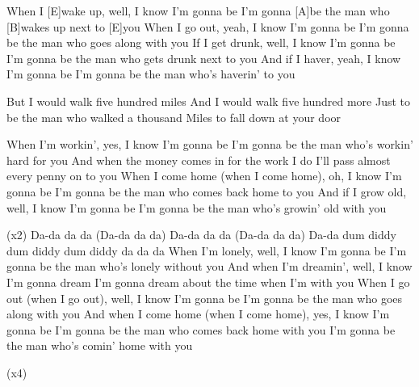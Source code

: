 

\begin{guitar}
	When I [E]wake up, well, I know I'm gonna be
	I'm gonna [A]be the man who [B]wakes up next to [E]you
	When I go out, yeah, I know I'm gonna be
	I'm gonna be the man who goes along with you
	If I get drunk, well, I know I'm gonna be
	I'm gonna be the man who gets drunk next to you
	And if I haver, yeah, I know I'm gonna be
	I'm gonna be the man who's haverin' to you
	
	But I would walk five hundred miles
	And I would walk five hundred more
	Just to be the man who walked a thousand
	Miles to fall down at your door
	
	When I'm workin', yes, I know I'm gonna be
	I'm gonna be the man who's workin' hard for you
	And when the money comes in for the work I do
	I'll pass almost every penny on to you
	When I come home (when I come home), oh, I know I'm gonna be
	I'm gonna be the man who comes back home to you
	And if I grow old, well, I know I'm gonna be
	I'm gonna be the man who's growin' old with you
	
	 
	
	 (x2)
	Da-da da da (Da-da da da)
	Da-da da da (Da-da da da)
	Da-da dum diddy dum diddy dum diddy da da da
	\pagebreak
	When I'm lonely, well, I know I'm gonna be
	I'm gonna be the man who's lonely without you
	And when I'm dreamin', well, I know I'm gonna dream
	I'm gonna dream about the time when I'm with you
	When I go out (when I go out), well, I know I'm gonna be
	I'm gonna be the man who goes along with you
	And when I come home (when I come home), yes, I know I'm gonna be
	I'm gonna be the man who comes back home with you
	I'm gonna be the man who's comin' home with you
	
	 
	
	  (x4)
	
	 
\end{guitar}